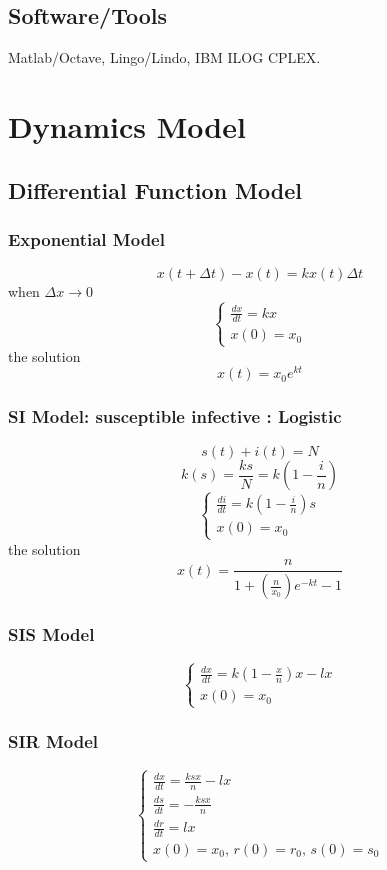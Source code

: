 \documentclass[12pt,a4paper]{article} \usepackage{kurier}
\begin{document}
\begin{CJK}{UTF8}{gkai}
\begin{multicols}{2}
	\subsection{Software/Tools}
		Matlab/Octave, Lingo/Lindo, IBM ILOG CPLEX.
\end{multicols}

\newpage
\section{Dynamics Model}
\begin{multicols}{2}
	\subsection{Differential Function Model}
		\subsubsection{Exponential Model}
			\[ x(t + \Delta t) - x(t) = k x(t) \Delta t \]
			when $\Delta x \to 0$
			\[ \left\{  \begin{array}{l}
				\frac{dx}{dt} = kx \\
				x(0) = x_0
				\end{array} \right.
			\]
			the solution
			\[ x(t) = x_0 e^{kt} \]
		\subsubsection{SI Model: susceptible infective : Logistic}
			\[ s(t) + i(t) = N \]
			\[ k(s) = \frac{ks}{N} = k(1- \frac{i}{n} )\]
			\[ \left\{ \begin{array}{l}
				\frac{di}{dt} = k(1-\frac{i}{n})s \\
				x(0) = x_0
				\end{array} \right.
			\]
			the solution
			\[ x(t) = \frac{n}{ 1+(\frac{n}{x_0}) e^{-kt} -1   }  \]
		\subsubsection{SIS Model}
			\[ \left\{ \begin{array}{l}
				\frac{dx}{dt} = k(1-\frac{x}{n})x -lx \\
				x(0) = x_0
				\end{array} \right.
			\]
		\subsubsection{SIR Model}
			\[ \left\{ \begin{array}{l}
				\frac{dx}{dt} = \frac{ksx}{n} - lx \\
				\frac{ds}{dt} = - \frac{ksx}{n} \\
				\frac{dr}{dt} = lx \\
				x(0) = x_0,\, r(0) = r_0,\, s(0) = s_0
				\end{array} \right.
			\]

\end{multicols}
\end{CJK}
\end{document}
